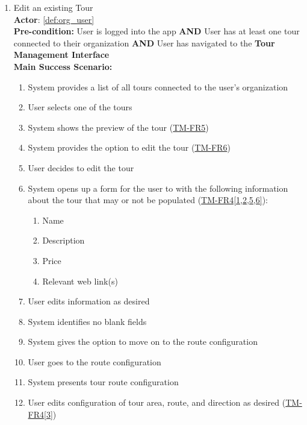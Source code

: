 \documentclass{article}
\begin{document}
\begin{enumerate}[label=\textbf{UC\arabic*}]
    \item \label{uc:3} Edit an existing Tour \\
          \textbf{Actor}: \ref{def:org_user} \\
          \textbf{Pre-condition:} User is logged into the app \textbf{AND} User has at least one tour connected to their organization \textbf{AND} User has navigated to the \textbf{Tour Management Interface} \\

          \textbf{Main Success Scenario:}
          \begin{enumerate}[label=\textbf{\arabic*.}]
              \item System provides a list of all tours connected to the user’s organization
              \item User selects one of the tours
              \item System shows the preview of the tour (\hyperref[ssub:tour_management]{TM-FR5})
              \item System provides the option to edit the tour (\hyperref[ssub:tour_management]{TM-FR6})
              \item User decides to edit the tour
              \item System opens up a form for the user to with the following information about the tour that may or not be populated (\hyperref[ssub:tour_management]{TM-FR4[1,2,5,6]}):
                    \begin{enumerate}
                        \item Name
                        \item Description
                        \item Price
                        \item Relevant web link(s)
                    \end{enumerate}
              \item User edits information as desired
              \item System identifies no blank fields
              \item System gives the option to move on to the route configuration
              \item User goes to the route configuration
              \item System presents tour route configuration
              \item User edits configuration of tour area, route, and direction as desired (\hyperref[ssub:tour_management]{TM-FR4[3]})

\end{enumerate}
\end{enumerate}
\end{document}
